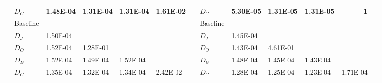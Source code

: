 \begin{table*}
\begin{tabular}{|l|l|lllll|l|lllll|}
           & $D_C$     & 1.48E-04 & 1.31E-04              & 1.31E-04              & 1.61E-02 &      & $D_C$     & 5.30E-05 & 1.31E-05              & 1.31E-05              & \multicolumn{1}{r}{1} &       \\
\hline
\SAIL{}     & Baseline &                     &                       &                  &          &      & Baseline &          &                       &                       &                       &       \\
              	 & $D_J$     &  1.50E-04&                       &                      &                   &      & $D_J$     &   1.45E-04&                       &                       &                       &       \\
           		& $D_O$     &   1.52E-04&     1.28E-01  &                       &                   &      & $D_O$     &  1.43E-04&4.61E-01&&&       \\
           		& $D_E$     &   1.52E-04&     1.49E-04   &    1.52E-04   &                   &      & $D_E$     &  1.48E-04&1.45E-04&1.43E-04&&       \\
           		& $D_C$     &   1.35E-04&      1.32E-04   &    1.34E-04  &    2.42E-02 &      & $D_C$     &  1.28E-04&1.25E-04&1.23E-04&1.71E-04&      \\
\hline           
\end{tabular}
\end{table*}

